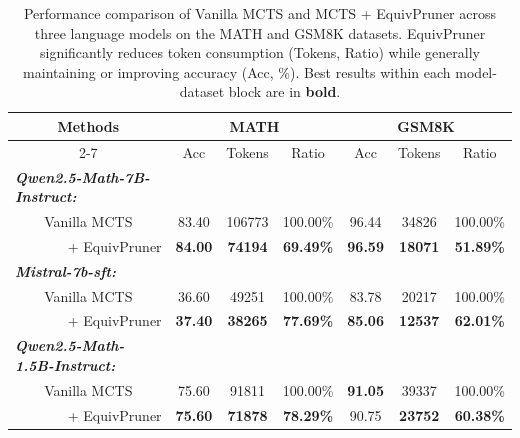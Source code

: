 \documentclass[11pt]{article}
\begin{document}
\begin{table}[ht]
\caption{Performance comparison of Vanilla MCTS and MCTS + EquivPruner across three language models on the MATH and GSM8K datasets. EquivPruner significantly reduces token consumption (Tokens, Ratio) while generally maintaining or improving accuracy (Acc, \%). Best results within each model-dataset block are in \textbf{bold}.}
\label{maintable}
\centering
\begin{tabular}{ccccccc}
\hline
\multirow{2}{*}{Methods}                                            & \multicolumn{3}{c}{MATH}                           & \multicolumn{3}{c}{GSM8K}                          \\ \cline{2-7} 
                                                                  & Acc            & Tokens         & Ratio            & Acc            & Tokens         & Ratio            \\ \hline
\multicolumn{1}{l}{\textit{\textbf{Qwen2.5-Math-7B-Instruct:}}}   &                &                &                  &                &                &                  \\
Vanilla MCTS                                                      & 83.40          & 106773         & 100.00\%         & 96.44          & 34826          & 100.00\%         \\
\multicolumn{1}{r}{+ EquivPruner}                                 & \textbf{84.00} & \textbf{74194} & \textbf{69.49\%} & \textbf{96.59} & \textbf{18071} & \textbf{51.89\%} \\ \hline
\multicolumn{1}{l}{\textit{\textbf{Mistral-7b-sft:}}}             &                &                &                  &                &                &                  \\
Vanilla MCTS                                                      & 36.60          & 49251          & 100.00\%         & 83.78          & 20217          & 100.00\%         \\
\multicolumn{1}{r}{+ EquivPruner}                                 & \textbf{37.40} & \textbf{38265} & \textbf{77.69\%} & \textbf{85.06} & \textbf{12537} & \textbf{62.01\%} \\ \hline
\multicolumn{1}{l}{\textit{\textbf{Qwen2.5-Math-1.5B-Instruct:}}} &                &                &                  &                &                &                  \\
Vanilla MCTS                                                      & 75.60          & 91811          & 100.00\%         & \textbf{91.05}          & 39337          & 100.00\%         \\
\multicolumn{1}{r}{+ EquivPruner}                                 & \textbf{75.60} & \textbf{71878} & \textbf{78.29\%} & 90.75 & \textbf{23752} & \textbf{60.38\%} \\ \hline
\end{tabular}
\end{table}
\end{document}

